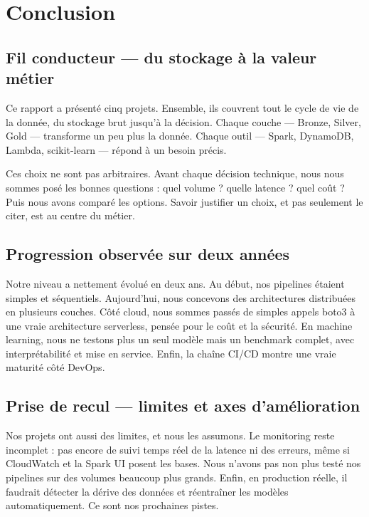 \documentclass{article}
\begin{document}


\newpage
\section{Conclusion}

\subsection{Fil conducteur --- du stockage à la valeur métier}

Ce rapport a présenté cinq projets. Ensemble, ils couvrent tout le cycle de vie de
la donnée, du stockage brut jusqu'à la décision. Chaque couche --- Bronze,
Silver, Gold --- transforme un peu plus la donnée. Chaque outil --- Spark, DynamoDB,
Lambda, scikit-learn --- répond à un besoin précis.

Ces choix ne sont pas arbitraires. Avant chaque décision technique, nous nous sommes
posé les bonnes questions : quel volume ? quelle latence ? quel coût ? Puis nous avons
comparé les options. Savoir justifier un choix, et pas seulement le citer, est au
centre du métier.

\subsection{Progression observée sur deux années}

Notre niveau a nettement évolué en deux ans. Au début, nos pipelines étaient simples
et séquentiels. Aujourd'hui, nous concevons des architectures distribuées en
plusieurs couches. Côté cloud, nous sommes passés de simples appels boto3 à une vraie
architecture serverless, pensée pour le coût et la sécurité. En machine learning,
nous ne testons plus un seul modèle mais un benchmark complet, avec interprétabilité
et mise en service. Enfin, la chaîne CI/CD montre une vraie maturité côté DevOps.

\subsection{Prise de recul --- limites et axes d'amélioration}

Nos projets ont aussi des limites, et nous les assumons. Le monitoring reste
incomplet : pas encore de suivi temps réel de la latence ni des erreurs, même si
CloudWatch et la Spark UI posent les bases. Nous n'avons pas non plus testé nos
pipelines sur des volumes beaucoup plus grands. Enfin, en production réelle, il
faudrait détecter la dérive des données et réentraîner les modèles automatiquement.
Ce sont nos prochaines pistes.
\end{document}

